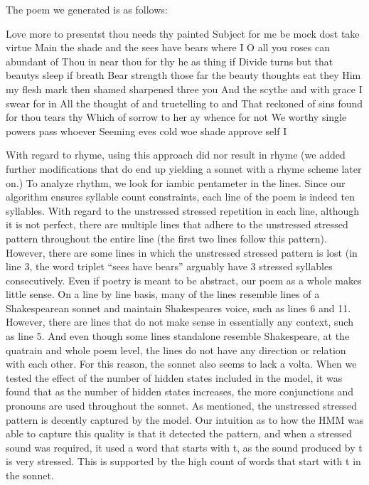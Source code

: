 \documentclass{article}
\begin{document}
The poem we generated is as follows:
\newline

Love more to presentst thou needs thy painted \newline
Subject for me be mock dost take virtue \newline
Main the shade and the sees have bears where I \newline
O all you roses can abundant of \newline
Thou in near thou for thy he as thing if \newline
Divide turns but that beautys sleep if breath \newline
Bear strength those far the beauty thoughts eat they \newline
Him my flesh mark then shamed sharpened three you \newline
And the scythe and with grace I swear for in \newline
All the thought of and truetelling to and \newline
That reckoned of sins found for thou tears thy \newline
Which of sorrow to her ay whence for not \newline
We worthy single powers pass whoever \newline
Seeming eves cold woe shade approve self I \newline

With regard to rhyme, using this approach did nor result in rhyme (we added further modifications that do end up yielding a sonnet with a rhyme scheme later on.) To analyze rhythm, we look for iambic pentameter in the lines. Since our algorithm ensures syllable count constraints, each line of the poem is indeed ten syllables. With regard to the unstressed stressed repetition in each line, although it is not perfect, there are multiple lines that adhere to the unstressed stressed pattern throughout the entire line (the first two lines follow this pattern). However, there are some lines in which the unstressed stressed pattern is lost (in line 3, the word triplet “sees have bears” arguably have 3 stressed syllables consecutively. Even if poetry is meant to be abstract, our poem as a whole makes little sense. On a line by line basis, many of the lines resemble lines of a Shakespearean sonnet and maintain Shakespeares voice, such as lines 6 and 11. However, there are lines that do not make sense in essentially any context, such as line 5. And even though some lines standalone resemble Shakespeare, at the quatrain and whole poem level, the lines do not have any direction or relation with each other. For this reason, the sonnet also seems to lack a volta. When we tested the effect of the number of hidden states included in the model, it was found that as the number of hidden states increases, the more conjunctions and pronouns are used throughout the sonnet. As mentioned, the unstressed stressed pattern is decently captured by the model. Our intuition as to how the HMM was able to capture this quality is that it detected the pattern, and when a stressed sound was required, it used a word that starts with t, as the sound produced by t is very stressed. This is supported by the high count of words that start with t in the sonnet. 
\end{document}
